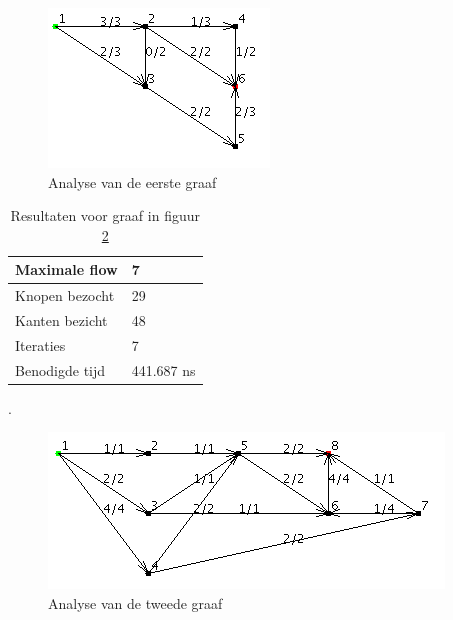 \begin{figure}[h]
	\includegraphics{breadthfirst/bfsgraph1}
	\centering
	\caption{Analyse van de eerste graaf}
	\label{fig:BFSgraph1}
\end{figure}

\begin{table}[h]
 \begin{tabularx}{\linewidth}{| l | X |}
 \hline
 Maximale flow & 7 \\
 \hline
 Knopen bezocht & 29 \\
 \hline
 Kanten bezicht & 48 \\
 \hline
 Iteraties & 7 \\
 \hline
 Benodigde tijd & 441.687 ns \\
 \hline
\end{tabularx}
\centering
\caption{Resultaten voor graaf in figuur \ref{fig:BFSgraph2}}.
\label{tbl:BFSgraph2}
\end{table}

\begin{figure}[h]
	\includegraphics{breadthfirst/bfsgraph2}
	\centering
	\caption{Analyse van de tweede graaf}
	\label{fig:BFSgraph2}
\end{figure}